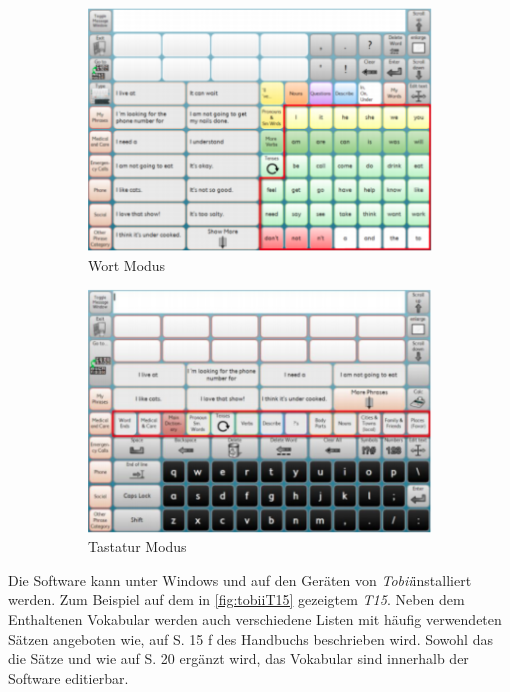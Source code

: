             \begin{figure}[H]
				\centering
				\begin{subfigure}{.49\linewidth}
  					\centering
  					\includegraphics[width=.8\linewidth]{images/sonoScribeWords.png}
  					\caption{Wort Modus 
                    	\parencite[S. 13]{tobii:sonoScribeManual}
                    }
                    \label{fig:sonoScribeWords}
				\end{subfigure}
				\begin{subfigure}{.49\linewidth}
  					\centering
  					\includegraphics[width=.8\linewidth]{images/SonoScribeKeboard.png}
  					\caption{Tastatur Modus 
                    	\parencite[S. 22]{tobii:sonoScribeManual}
                    }
                    \label{fig:sonoScribeKeyboard}
				\end{subfigure}
                \caption{ }
                \label{fig:sonoScribe}
			\end{figure}
        	
            Die Software kann unter Windows und auf den Geräten von \emph{Tobii}installiert werden. Zum Beispiel auf dem in \autoref{fig:tobiiT15} gezeigtem \emph{T15}. Neben dem Enthaltenen Vokabular werden auch verschiedene Listen mit häufig verwendeten Sätzen angeboten wie, auf S. 15 f des Handbuchs beschrieben wird. Sowohl das die Sätze und wie auf S. 20 ergänzt wird, das Vokabular sind innerhalb der Software editierbar.
            
